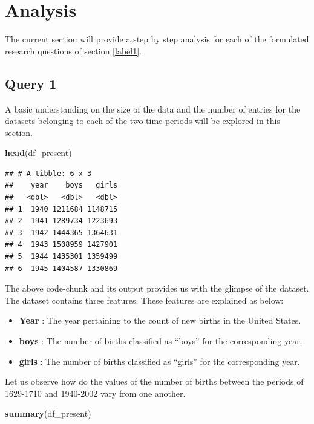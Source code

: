 \documentclass[11pt,a4paper,]{article}
\newenvironment{Shaded}{\begin{snugshade}}{\end{snugshade}}
\newcommand{\FunctionTok}[1]{\textcolor[rgb]{0.13,0.29,0.53}{\textbf{#1}}}
\newcommand{\NormalTok}[1]{#1}
\providecommand{\tightlist}{%
  \setlength{\itemsep}{0pt}\setlength{\parskip}{0pt}}
\begin{document}
\hypertarget{label2}{%
\section{Analysis}\label{label2}}

The current section will provide a step by step analysis for each of the formulated research questions of section \ref{label1}.

\hypertarget{query-1}{%
\subsection{Query 1}\label{query-1}}

A basic understanding on the size of the data and the number of entries for the datasets belonging to each of the two time periods will be explored in this section.

\begin{Shaded}
\begin{Highlighting}[]
\FunctionTok{head}\NormalTok{(df\_present)}
\end{Highlighting}
\end{Shaded}

\begin{verbatim}
## # A tibble: 6 x 3
##    year    boys   girls
##   <dbl>   <dbl>   <dbl>
## 1  1940 1211684 1148715
## 2  1941 1289734 1223693
## 3  1942 1444365 1364631
## 4  1943 1508959 1427901
## 5  1944 1435301 1359499
## 6  1945 1404587 1330869
\end{verbatim}

The above code-chunk and its output provides us with the glimpse of the dataset. The dataset contains three features. These features are explained as below:

\begin{itemize}
\tightlist
\item
  \textbf{Year} : The year pertaining to the count of new births in the United States.
\item
  \textbf{boys} : The number of births classified as ``boys'' for the corresponding year.
\item
  \textbf{girls} : The number of births classified as ``girls'' for the corresponding year.
\end{itemize}

Let us observe how do the values of the number of births between the periods of 1629-1710 and 1940-2002 vary from one another.

\scriptsize

\begin{Shaded}
\begin{Highlighting}[]
\FunctionTok{summary}\NormalTok{(df\_present)}
\end{Highlighting}
\end{Shaded}
\end{document}
